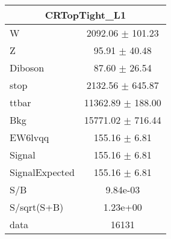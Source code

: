 \begin{table}
{\begin{tabular}{|l|c|}
\hline
\multicolumn{2}{|c|}{CRTopTight\_L1}\\ \hline
W & 2092.06 $\pm$ 101.23\\
Z & 95.91 $\pm$ 40.48\\
Diboson & 87.60 $\pm$ 26.54\\
stop & 2132.56 $\pm$ 645.87\\
ttbar & 11362.89 $\pm$ 188.00\\
\hline
Bkg & 15771.02 $\pm$ 716.44\\
\hline
EW6lvqq & 155.16 $\pm$ 6.81\\
\hline
Signal & 155.16 $\pm$ 6.81\\
SignalExpected & 155.16 $\pm$ 6.81\\
\hline
S/B & 9.84e-03\\
S/sqrt(S+B) & 1.23e+00\\
\hline
data & 16131\\ \hline
\end{tabular}
}
\end{table}


